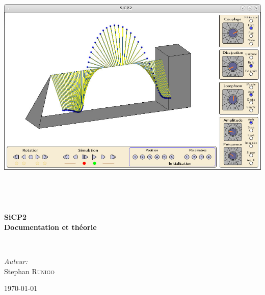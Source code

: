 \begin{titlepage}
\begin{center}

\includegraphics[width=.9\textwidth]{./illustration/SiCP2}
\label{fig:image1}
~\\[1cm]


~\\[1cm]

\textsc{\Large }\\[0.5cm]

\HRule \\[0.4cm]

{\huge \bfseries  SiCP2\\
Documentation et théorie\\[0.4cm] }

\HRule \\[1.5cm]

\begin{minipage}{0.4\textwidth}
\begin{flushleft} \large
\end{flushleft}
\end{minipage}
\begin{minipage}{0.4\textwidth}
\begin{flushright} \large
\emph{Auteur:}\\
Stephan \textsc{Runigo}
\end{flushright}
\end{minipage}

\vfill

{\large \today}

\end{center}
\end{titlepage}
